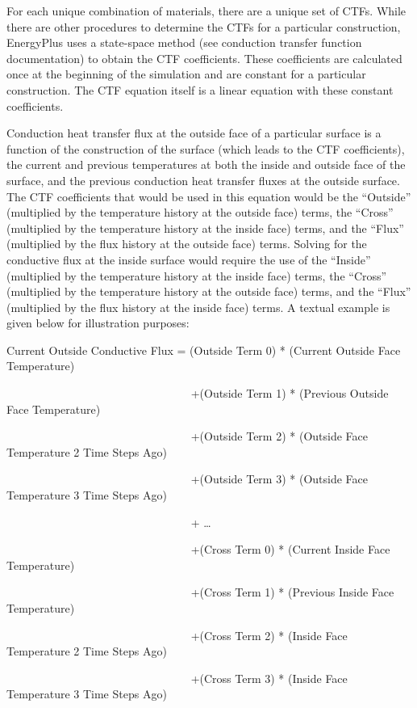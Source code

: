 For each unique combination of materials, there are a unique set of CTFs. While there are other procedures to determine the CTFs for a particular construction, EnergyPlus uses a state-space method (see conduction transfer function documentation) to obtain the CTF coefficients. These coefficients are calculated once at the beginning of the simulation and are constant for a particular construction. The CTF equation itself is a linear equation with these constant coefficients.

Conduction heat transfer flux at the outside face of a particular surface is a function of the construction of the surface (which leads to the CTF coefficients), the current and previous temperatures at both the inside and outside face of the surface, and the previous conduction heat transfer fluxes at the outside surface. The CTF coefficients that would be used in this equation would be the ``Outside'' (multiplied by the temperature history at the outside face) terms, the ``Cross'' (multiplied by the temperature history at the inside face) terms, and the ``Flux'' (multiplied by the flux history at the outside face) terms. Solving for the conductive flux at the inside surface would require the use of the ``Inside'' (multiplied by the temperature history at the inside face) terms, the ``Cross'' (multiplied by the temperature history at the outside face) terms, and the ``Flux'' (multiplied by the flux history at the inside face) terms. A textual example is given below for illustration purposes:

Current Outside Conductive Flux = (Outside Term 0) * (Current Outside Face Temperature)

~~~~~~~~~~~~~~~~~~~~~~~~~~~~~~~~ +(Outside Term 1) * (Previous Outside Face Temperature)

~~~~~~~~~~~~~~~~~~~~~~~~~~~~~~~~ +(Outside Term 2) * (Outside Face Temperature 2 Time Steps Ago)

~~~~~~~~~~~~~~~~~~~~~~~~~~~~~~~~ +(Outside Term 3) * (Outside Face Temperature 3 Time Steps Ago)

~~~~~~~~~~~~~~~~~~~~~~~~~~~~~~~~ + \ldots{}

~~~~~~~~~~~~~~~~~~~~~~~~~~~~~~~~ +(Cross Term 0) * (Current Inside Face Temperature)

~~~~~~~~~~~~~~~~~~~~~~~~~~~~~~~~ +(Cross Term 1) * (Previous Inside Face Temperature)

~~~~~~~~~~~~~~~~~~~~~~~~~~~~~~~~ +(Cross Term 2) * (Inside Face Temperature 2 Time Steps Ago)

~~~~~~~~~~~~~~~~~~~~~~~~~~~~~~~~ +(Cross Term 3) * (Inside Face Temperature 3 Time Steps Ago)

